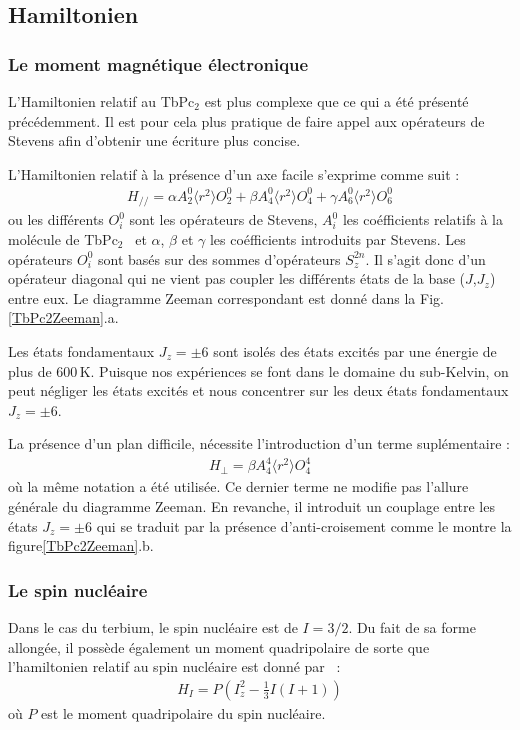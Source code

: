 \subsection{Hamiltonien}

\subsubsection{Le moment magnétique électronique}
L'Hamiltonien relatif au TbPc$_2$ est plus complexe que ce qui a été présenté précédemment. Il est pour cela plus pratique de faire appel aux opérateurs de Stevens afin d'obtenir une écriture plus concise.

L'Hamiltonien relatif à la présence d'un axe facile s'exprime comme suit :
\begin{eqnarray}
H_{//} = \alpha A_2^0 \langle r^2 \rangle O_2^0 + \beta A_4^0 \langle r^2 \rangle O_4^0 + \gamma A_6^0 \langle r^2 \rangle O_6^0
\end{eqnarray}
ou les différents $O_i^0$ sont les opérateurs de Stevens, $A_i^0$ les coéfficients relatifs à la molécule de TbPc$_2$~\cite{Ishikawa2005} et $\alpha$, $\beta$ et $\gamma$ les coéfficients introduits par Stevens. Les opérateurs $O^0_i$ sont basés sur des sommes d'opérateurs $S_z^{2n}$. Il s'agit donc d'un opérateur diagonal qui ne vient pas coupler les différents états de la base ($J$,$J_z$) entre eux. Le diagramme Zeeman correspondant est donné dans la Fig.\ref{TbPc2Zeeman}.a.

Les états fondamentaux $J_z = \pm 6$ sont isolés des états excités par une énergie de plus de $600$\,K. Puisque nos expériences se font dans le domaine du sub-Kelvin, on peut négliger les états excités et nous concentrer sur les deux états fondamentaux  $J_z = \pm 6$.

La présence d'un plan difficile, nécessite l'introduction d'un terme suplémentaire :
\begin{eqnarray}
H_{\perp} = \beta A_4^4 \langle r^2 \rangle O_4^4
\end{eqnarray}
où la m\^eme notation a été utilisée. Ce dernier terme ne modifie pas l'allure générale du diagramme Zeeman. En revanche, il introduit un couplage entre les états  $J_z = \pm 6$ qui se traduit par la présence d'anti-croisement comme le montre la figure\ref{TbPc2Zeeman}.b.

\subsubsection{Le spin nucléaire}
Dans le cas du terbium, le spin nucléaire est de $I = 3/2$. Du fait de sa forme allongée, il possède également un moment quadripolaire de sorte que l'hamiltonien relatif au spin nucléaire est donné par~\cite{Bleaney1961} :
\begin{eqnarray}
H_I = P\left(I_z^2 - \frac{1}{3}I(I+1)\right)
\end{eqnarray}
où $P$ est le moment quadripolaire du spin nucléaire.

